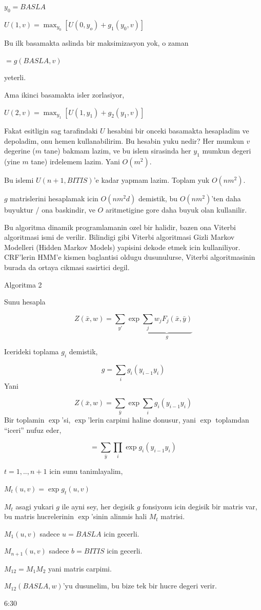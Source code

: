\documentclass[12pt,fleqn]{article}\usepackage{../common}
\begin{document}
$y_0 = BASLA$

$U(1,v) = \max_{y_0} [ U(0,y_o) + g_1(y_0,v)]$

Bu ilk basamakta aslinda bir maksimizasyon yok, o zaman 

$ = g(BASLA,v)$

yeterli. 

Ama ikinci basamakta isler zorlasiyor, 

$U(2,v) = \max_{y_1} [ U(1,y_1) + g_2(y_1,v) ]$

Fakat esitligin sag tarafindaki $U$ hesabini bir onceki basamakta
hesapladim ve depoladim, onu hemen kullanabilirim. Bu hesabin yuku nedir? 
Her mumkun $v$ degerine ($m$ tane) bakmam lazim, ve bu islem sirasinda her
$y_1$ mumkun degeri (yine $m$ tane) irdelemem lazim. Yani $O(m^2)$. 

Bu islemi $U(n+1, BITIS)$'e kadar yapmam lazim. Toplam yuk $O(nm^2)$. 

$g$ matrislerini hesaplamak icin $O(nm^2d)$ demistik, bu  $O(nm^2)$'ten
daha buyuktur / ona baskindir, ve $O$ aritmetigine gore daha buyuk olan 
kullanilir. 

Bu algoritma dinamik programlamanin ozel bir halidir, bazen ona Viterbi
algoritmasi ismi de verilir. Bilindigi gibi Viterbi algoritmasi Gizli
Markov Modelleri (Hidden Markov Models) yapisini dekode etmek icin
kullaniliyor. CRF'lerin HMM'e kismen baglantisi oldugu dusunulurse, Viterbi
algoritmasinin burada da ortaya cikmasi sasirtici degil. 

Algoritma 2

Sunu hesapla

$$Z(\bar{x},w) = \sum_{y'} \exp 
\underbrace{\sum_j w_j F_j(\bar{x},\bar{y})}_{g}
$$

Icerideki toplama $g_i$ demistik, 

$$ g = \sum_i g_i(y_{i-1}y_i) $$
Yani


$$Z(\bar{x},w) = 
\sum_{\bar{y}} \exp 
\sum_i g_i(y_{i-1}y_i) 
$$
Bir toplamin $\exp$'si, $\exp$'lerin carpimi haline donusur, yani $\exp$
toplamdan ``iceri'' nufuz eder, 

$$
 = \sum_{\bar{y}} \prod_i \exp  g_i(y_{i-1}y_i) 
$$

$t=1,..,n+1$ icin sunu tanimlayalim,

$M_t(u,v) = \exp g_t(u,v)$

$M_t$ asagi yukari $g$ ile ayni sey, her degisik $g$ fonsiyonu icin degisik
bir matris var, bu matris hucrelerinin $\exp$'sinin alinmis hali $M_t$ matrisi.

$M_1(u,v)$ sadece $u=BASLA$ icin gecerli. 

$M_{n+1}(u,v)$ sadece $b=BITIS$ icin gecerli. 

$M_{12} = M_1M_2$ yani matris carpimi. 

$M_{12}(BASLA,w)$'yu dusunelim, bu bize tek bir hucre degeri verir. 

6:30
\end{document}
